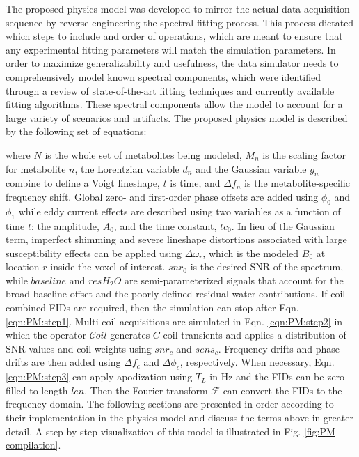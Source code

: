 The proposed physics model was developed to mirror the actual data acquisition sequence by reverse engineering the spectral fitting process. This process dictated which steps to include and order of operations, which are meant to ensure that any experimental fitting parameters will match the simulation parameters. 
In order to maximize generalizability and usefulness, the data simulator needs to comprehensively model known spectral components, which were identified through a review of state-of-the-art fitting techniques and currently available fitting algorithms. These spectral components allow the model to account for a large variety of scenarios and artifacts. The proposed physics model is described by the following set of equations:

where $N$ is the whole set of metabolites being modeled, $M_n$ is the scaling factor for metabolite $n$, the Lorentzian variable $d_n$ and the Gaussian variable $g_n$ combine to define a Voigt lineshape, $t$ is time, and $\Delta f_n$ is the metabolite-specific frequency shift. Global zero- and first-order phase offsets are added using $\phi_0$ and $\phi_1$ while eddy current effects are described using two variables as a function of time $t$: the amplitude, $A_0$, and the time constant, $tc_0$. In lieu of the Gaussian term, imperfect shimming and severe lineshape distortions associated with large susceptibility effects can be applied using $\Delta\omega_r$, which is the modeled $B_0$ at location $r$ inside the voxel of interest. $snr_0$ is the desired SNR of the spectrum, while $baseline$ and $resH_2O$ are semi-parameterized signals that account for the broad baseline offset and the poorly defined residual water contributions. If coil-combined FIDs are required, then the simulation can stop after Eqn. \ref{eqn:PM:step1}. Multi-coil acquisitions are simulated in Eqn. \ref{eqn:PM:step2} in which the operator $\mathcal{C}oil$ generates $C$ coil transients and applies a distribution of SNR values and coil weights using $snr_c$ and $sens_c$. Frequency drifts and phase drifts are then added using $\Delta f_c$ and $\Delta \phi_c$, respectively. When necessary, Eqn. \ref{eqn:PM:step3} can apply apodization using $T_L$ in Hz and the FIDs can be zero-filled to length $len$. Then the Fourier transform $\mathcal{F}$ can convert the FIDs to the frequency domain. %
The following sections are presented in order according to their implementation in the physics model and discuss the terms above in greater detail. A step-by-step visualization of this model is illustrated in Fig. \ref{fig:PM compilation}.

